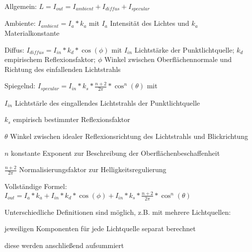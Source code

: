 \documentclass[landscape]{article}
\begin{document}
\begin{multicols}{3}
  
  \begin{itemize*}
    \item Allgemein: $L=I_{out}=I_{ambient}+I_{diffus}+I_{specular}$
    \item Ambiente: $I_{ambient}=I_a * k_a$ mit $I_a$ Intensität des Lichtes und $k_a$ Materialkonstante
    \item Diffus: $I_{diffus}=I_{in}*k_d*\cos(\phi)$ mit $I_{in}$ Lichtstärke der Punktlichtquelle; $k_d$ empirischem Reflexionsfaktor; $\phi$ Winkel zwischen Oberflächennormale und Richtung des einfallenden Lichtstrahls
    \item Spiegelnd: $I_{specular}=I_{in}*k_s*\frac{n+2}{2\pi}*\cos^n({\theta})$ mit
    \item $I_{in}$ Lichtstärle des eingallendes Lichtstrahls der Punktlichtquelle
    \item $k_s$ empirisch bestimmter Reflexionsfaktor
    \item $\theta$ Winkel zwischen idealer Reflexionsrichtung des Lichtstrahls und Blickrichtung
    \item $n$ konstante Exponent zur Beschreibung der Oberflächenbeschaffenheit
    \item $\frac{n+2}{2\pi}$ Normalisierungsfaktor zur Helligkeitsregulierung
    \item Vollständige Formel: $I_{out}=I_a*k_a+I_{in}*k_d*\cos(\phi)+I_{in}*k_s*\frac{n+2}{2\pi}*\cos^n(\theta)$
  \end{itemize*}
  Unterschiedliche Definitionen sind möglich, z.B. mit mehrere Lichtquellen:
  \begin{itemize*}
    \item jeweiligen Komponenten für jede Lichtquelle separat berechnet
    \item diese werden anschließend aufsummiert
  \end{itemize*}
  

\end{multicols}
\end{document}
